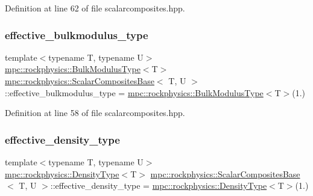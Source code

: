Definition at line 62 of file scalarcomposites.\+hpp.

\mbox{\label{classmpc_1_1rockphysics_1_1_scalar_composites_base_a6ca760221b4aedaa09698317c7fddfb3}} 
\subsubsection{\texorpdfstring{effective\+\_\+bulkmodulus\+\_\+type}{effective\_bulkmodulus\_type}}
{\footnotesize\ttfamily template$<$typename T, typename U$>$ \\
\mbox{\hyperlink{structmpc_1_1rockphysics_1_1_bulk_modulus_type}{mpc\+::rockphysics\+::\+Bulk\+Modulus\+Type}}$<$T$>$ \mbox{\hyperlink{classmpc_1_1rockphysics_1_1_scalar_composites_base}{mpc\+::rockphysics\+::\+Scalar\+Composites\+Base}}$<$ T, U $>$\+::effective\+\_\+bulkmodulus\+\_\+type = \mbox{\hyperlink{structmpc_1_1rockphysics_1_1_bulk_modulus_type}{mpc\+::rockphysics\+::\+Bulk\+Modulus\+Type}}$<$T$>$(1.)\hspace{0.3cm}{\ttfamily [protected]}}



Definition at line 58 of file scalarcomposites.\+hpp.

\mbox{\label{classmpc_1_1rockphysics_1_1_scalar_composites_base_a0130d1233808c5fa98d90157274f671c}} 
\subsubsection{\texorpdfstring{effective\+\_\+density\+\_\+type}{effective\_density\_type}}
{\footnotesize\ttfamily template$<$typename T, typename U$>$ \\
\mbox{\hyperlink{structmpc_1_1rockphysics_1_1_density_type}{mpc\+::rockphysics\+::\+Density\+Type}}$<$T$>$ \mbox{\hyperlink{classmpc_1_1rockphysics_1_1_scalar_composites_base}{mpc\+::rockphysics\+::\+Scalar\+Composites\+Base}}$<$ T, U $>$\+::effective\+\_\+density\+\_\+type = \mbox{\hyperlink{structmpc_1_1rockphysics_1_1_density_type}{mpc\+::rockphysics\+::\+Density\+Type}}$<$T$>$(1.)\hspace{0.3cm}{\ttfamily [protected]}}



